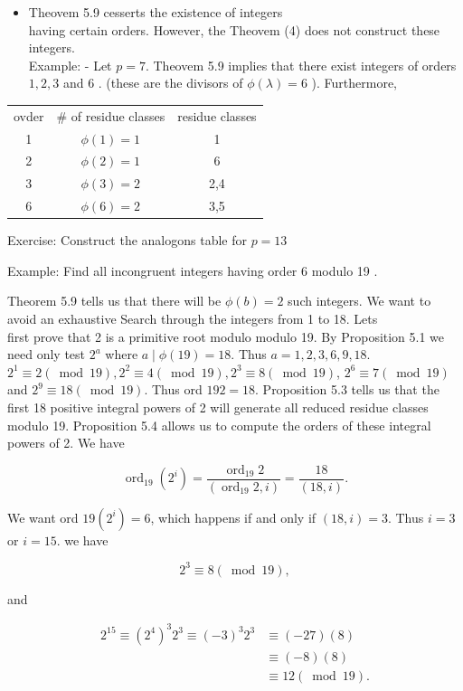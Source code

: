 \documentclass[10pt]{article}
\begin{document}
\begin{itemize}
  \item Theovem 5.9 cesserts the existence of integers\\
having certain orders. However, the Theovem (4) does not construct these integers.\\
Example: - Let $p=7$. Theovem 5.9 implies that there exist integers of orders $1,2,3$ and 6 . (these are the divisors of $\phi(\lambda)=6$ ). Furthermore,
\end{itemize}

\begin{center}
\begin{tabular}{c|c|c}
ovder & \# of residue classes & residue classes \\
1 & $\phi(1)=1$ & 1 \\
2 & $\phi(2)=1$ & 6 \\
3 & $\phi(3)=2$ & 2,4 \\
6 & $\phi(6)=2$ & 3,5 \\
\end{tabular}
\end{center}

Exercise: Construct the analogons table for $p=13$

Example: Find all incongruent integers having order 6 modulo 19 .

Theorem 5.9 tells us that there will be $\phi(b)=2$ such integers. We want to avoid an exhaustive Search through the integers from 1 to 18. Lets\\
first prove that 2 is a primitive root modulo modulo 19. By Proposition 5.1 we need only test $2^{a}$ where $a \mid \phi(19)=18$. Thus $a=1,2,3,6,9,18$. $2^{1} \equiv 2(\bmod 19), 2^{2} \equiv 4(\bmod 19), 2^{3} \equiv 8(\bmod 19)$, $2^{6} \equiv 7(\bmod 19)$ and $2^{9} \equiv 18(\bmod 19)$. Thus ord $192=18$. Proposition 5.3 tells us that the first 18 positive integral powers of 2 will generate all reduced residue classes modulo 19. Proposition 5.4 allows us to compute the orders of these integral powers of 2. We have

$$
\operatorname{ord}_{19}\left(2^{i}\right)=\frac{\operatorname{ord}_{19} 2}{\left(\operatorname{ord}_{19} 2, i\right)}=\frac{18}{(18, i)} .
$$

We want ord $19\left(2^{i}\right)=6$, which happens if and only if $(18, i)=3$. Thus $i=3$ or $i=15$. we have

$$
2^{3} \equiv 8(\bmod 19),
$$

and

$$
\begin{aligned}
2^{15} \equiv\left(2^{4}\right)^{3} 2^{3} \equiv(-3)^{3} 2^{3} & \equiv(-27)(8) \\
& \equiv(-8)(8) \\
& \equiv 12(\bmod 19) .
\end{aligned}
$$
\end{document}
